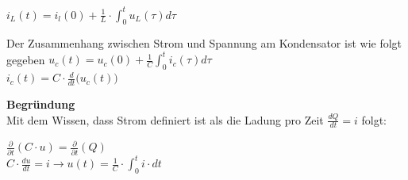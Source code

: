 $\displaystyle  i_L(t) = i_l(0) + \frac{1}{L} \cdot \int_0^t u_L(\tau) d\tau$

\formulaEnd
\iend


\begingl
Der Zusammenhang zwischen Strom und Spannung am Kondensator ist wie folgt gegeben
\formulaBegin
$\displaystyle u_c(t) = u_c(0) + \frac{1}{C} \int_0^t i_c(\tau) d\tau$ \\

$\displaystyle i_c(t) = C \cdot \frac{d}{d t} \big(u_c(t) \big)$ \\
\formulaEnd
\iend


\textbf{Begründung} \\
Mit dem Wissen, dass Strom definiert ist als die Ladung pro Zeit $ \displaystyle \frac{dQ}{dt} = i$ folgt: \\
\begin{center}
	$\displaystyle \frac{\partial}{\partial t} (C \cdot u) = \frac{\partial}{\partial t} (Q) $ \\
	$ \displaystyle C \cdot \frac{du}{dt} = i \rightarrow u(t) = \frac{1}{C} \cdot \int_0^t i \cdot dt$
\end{center}
